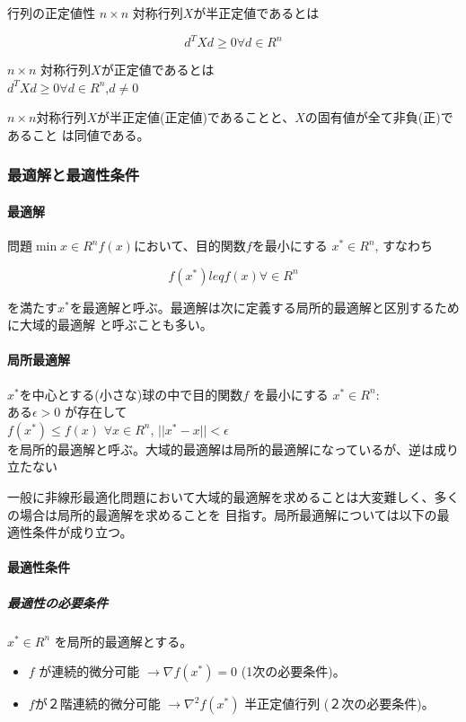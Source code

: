 \documentclass{jsarticle}
\begin{document}
行列の正定値性
$n \times n$ 対称行列$X$が半正定値であるとは

$$
d^TXd \geq 0 \forall d \in R^n
$$

$n \times n$ 対称行列$X$が正定値であるとは \\
$d^TXd \geq 0 \forall d \in R^n$,$d \neq 0$

$n \times n$対称行列$X$が半正定値(正定値)であることと、$X$の固有値が全て非負(正)であること
は同値である。

\subsubsection{最適解と最適性条件}
\paragraph{最適解} 問題$\min{x \in R^n} f(x)$において、目的関数$f$を最小にする
$x^{\ast} \in R^n$, すなわち

$$
f(x^{\ast}) leq f(x) \forall \in R^n
$$

を満たす$x^{\ast}$を最適解と呼ぶ。最適解は次に定義する局所的最適解と区別するために大域的最適解
と呼ぶことも多い。

\paragraph{局所最適解} $x^{\ast}$を中心とする(小さな)球の中で目的関数$f$ を最小にする $x^{\ast} \in R^n :$ \\
ある$\epsilon > 0$ が存在して \\

$f(x^{\ast}) \leq f(x)$   $\forall x \in R^n$, $|| x^{\ast} - x || < \epsilon$ \\

を局所的最適解と呼ぶ。大域的最適解は局所的最適解になっているが、逆は成り立たない

一般に非線形最適化問題において大域的最適解を求めることは大変難しく、多くの場合は局所的最適解を求めることを
目指す。局所最適解については以下の最適性条件が成り立つ。

\paragraph{最適性条件}
\subparagraph{最適性の必要条件} $x^{\ast} \in R^n$ を局所的最適解とする。

\begin{itemize}
  \item $f$ が連続的微分可能 $\rightarrow \nabla f(x^{\ast}) = 0$ (1次の必要条件)。
  \item $f$が２階連続的微分可能 $\rightarrow {\nabla}^2 f(x^{\ast})$ 半正定値行列 (２次の必要条件)。
\end{itemize}
\end{document}
